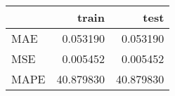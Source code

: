 \begin{tabular}{lrr}
\toprule
{} &      train &       test \\
\midrule
MAE  &   0.053190 &   0.053190 \\
MSE  &   0.005452 &   0.005452 \\
MAPE &  40.879830 &  40.879830 \\
\bottomrule
\end{tabular}
